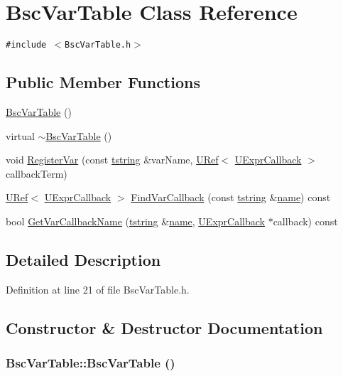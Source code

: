 \hypertarget{class_bsc_var_table}{
\section{BscVarTable Class Reference}
\label{class_bsc_var_table}
}
{\tt \#include $<$BscVarTable.h$>$}

\subsection*{Public Member Functions}
\begin{CompactItemize}
\item 
\hyperlink{class_bsc_var_table_dbd636a0978c26bf7633d5f41cd6157b}{BscVarTable} ()
\item 
virtual \hyperlink{class_bsc_var_table_f319d39ba041ac06caf94d5924e18cea}{$\sim$BscVarTable} ()
\item 
void \hyperlink{class_bsc_var_table_eccd623b3da9a4d350b8563f90d0f6b6}{RegisterVar} (const \hyperlink{common__afx_8h_816fa58fd77499b0edb2c69ebe803d5c}{tstring} \&varName, \hyperlink{class_u_ref}{URef}$<$ \hyperlink{class_u_expr_callback}{UExprCallback} $>$ callbackTerm)
\item 
\hyperlink{class_u_ref}{URef}$<$ \hyperlink{class_u_expr_callback}{UExprCallback} $>$ \hyperlink{class_bsc_var_table_99981703077f5c8d7af15452682f2123}{FindVarCallback} (const \hyperlink{common__afx_8h_816fa58fd77499b0edb2c69ebe803d5c}{tstring} \&\hyperlink{glext__bak_8h_bb62efe59ccdd153ce42e1a418352209}{name}) const 
\item 
bool \hyperlink{class_bsc_var_table_36a70f0711ba55827d6a596a246644a7}{GetVarCallbackName} (\hyperlink{common__afx_8h_816fa58fd77499b0edb2c69ebe803d5c}{tstring} \&\hyperlink{glext__bak_8h_bb62efe59ccdd153ce42e1a418352209}{name}, \hyperlink{class_u_expr_callback}{UExprCallback} $\ast$callback) const 
\end{CompactItemize}


\subsection{Detailed Description}


Definition at line 21 of file BscVarTable.h.

\subsection{Constructor \& Destructor Documentation}
\hypertarget{class_bsc_var_table_dbd636a0978c26bf7633d5f41cd6157b}{
\subsubsection[{BscVarTable}]{\setlength{\rightskip}{0pt plus 5cm}BscVarTable::BscVarTable ()}}
\label{class_bsc_var_table_dbd636a0978c26bf7633d5f41cd6157b}





